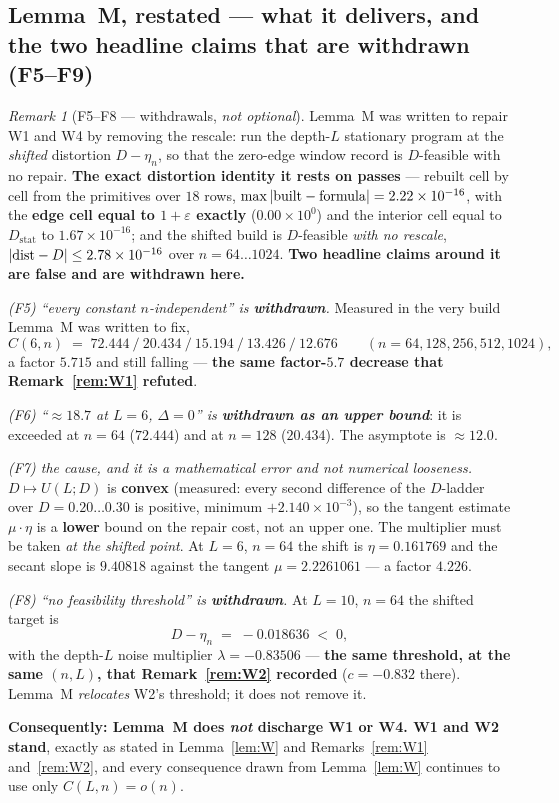 \documentclass[11pt]{article}
\theoremstyle{definition}
\theoremstyle{remark}
\newtheorem{remark}{Remark}
\begin{document}
\subsection{Lemma~M, restated --- what it delivers, and the two headline
claims that are withdrawn (F5--F9)}

\begin{remark}[F5--F8 --- withdrawals, \emph{not optional}]
\label{rem:F5F8}
Lemma~M was written to repair W1 and W4 by removing the rescale: run the
depth-$L$ stationary program at the \emph{shifted} distortion
$D-\eta_n$, so that the zero-edge window record is $D$-feasible with no
repair. \textbf{The exact distortion identity it rests on passes} --- rebuilt
cell by cell from the primitives over $18$ rows, $\max|{\rm
built}-{\rm formula}|=2.22\times10^{-16}$, with the \textbf{edge cell equal to
$1+\varepsilon$ exactly} ($0.00\times10^{0}$) and the interior cell equal to
$D_{\mathrm{stat}}$ to $1.67\times10^{-16}$; and the shifted build is
$D$-feasible \emph{with no rescale}, $|{\rm dist}-D|\le2.78\times10^{-16}$
over $n=64\ldots1024$. \textbf{Two headline claims around it are false and are
withdrawn here.}

\emph{(F5) ``every constant $n$-independent'' is \textbf{withdrawn}.} Measured
in the very build Lemma~M was written to fix,
\[
C(6,n)\;=\;72.444\ /\ 20.434\ /\ 15.194\ /\ 13.426\ /\ 12.676
\qquad(n=64,128,256,512,1024),
\]
a factor $5.715$ and still falling --- \textbf{the same factor-$5.7$ decrease
that Remark~\ref{rem:W1} refuted}.

\emph{(F6) ``$\approx18.7$ at $L=6$, $\Delta=0$'' is \textbf{withdrawn as an
upper bound}}: it is exceeded at $n=64$ ($72.444$) and at $n=128$ ($20.434$).
The asymptote is $\approx12.0$.

\emph{(F7) the cause, and it is a mathematical error and not numerical
looseness.} $D\mapsto U(L;D)$ is \textbf{convex} (measured: every second
difference of the $D$-ladder over $D=0.20\ldots0.30$ is positive, minimum
$+2.140\times10^{-3}$), so the tangent estimate $\mu\cdot\eta$ is a
\textbf{lower} bound on the repair cost, not an upper one. The multiplier must
be taken \emph{at the shifted point}. At $L=6$, $n=64$ the shift is
$\eta=0.161769$ and the secant slope is $9.40818$ against the tangent
$\mu=2.2261061$ --- a factor $4.226$.

\emph{(F8) ``no feasibility threshold'' is \textbf{withdrawn}.} At $L=10$,
$n=64$ the shifted target is
\[
D-\eta_n\;=\;-0.018636\;<\;0,
\]
with the depth-$L$ noise multiplier $\lambda=-0.83506$ --- \textbf{the same
threshold, at the same $(n,L)$, that Remark~\ref{rem:W2} recorded} ($c=-0.832$
there). Lemma~M \emph{relocates} W2's threshold; it does not remove it.

\medskip\noindent\textbf{Consequently: Lemma~M does \emph{not} discharge W1 or
W4. W1 and W2 stand}, exactly as stated in Lemma~\ref{lem:W} and
Remarks~\ref{rem:W1} and~\ref{rem:W2}, and every consequence drawn from
Lemma~\ref{lem:W} continues to use only $C(L,n)=o(n)$.
\end{remark}
\end{document}
